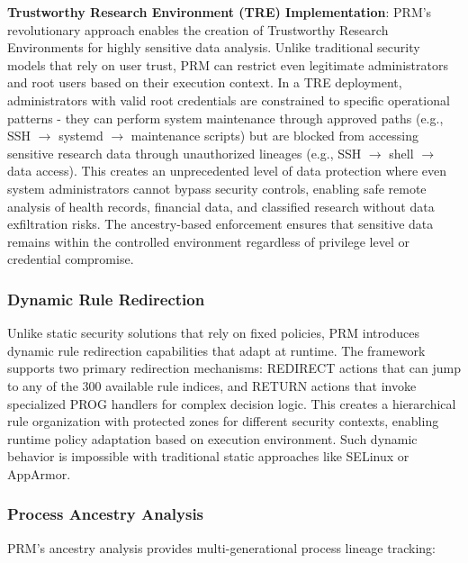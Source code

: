 \documentclass[conference]{IEEEtran}
\begin{document}
\textbf{Trustworthy Research Environment (TRE) Implementation}: PRM's revolutionary approach enables the creation of Trustworthy Research Environments for highly sensitive data analysis. Unlike traditional security models that rely on user trust, PRM can restrict even legitimate administrators and root users based on their execution context. In a TRE deployment, administrators with valid root credentials are constrained to specific operational patterns - they can perform system maintenance through approved paths (e.g., SSH $\rightarrow$ systemd $\rightarrow$ maintenance scripts) but are blocked from accessing sensitive research data through unauthorized lineages (e.g., SSH $\rightarrow$ shell $\rightarrow$ data access). This creates an unprecedented level of data protection where even system administrators cannot bypass security controls, enabling safe remote analysis of health records, financial data, and classified research without data exfiltration risks. The ancestry-based enforcement ensures that sensitive data remains within the controlled environment regardless of privilege level or credential compromise.

\subsubsection{Dynamic Rule Redirection}
Unlike static security solutions that rely on fixed policies, PRM introduces dynamic rule redirection capabilities that adapt at runtime. The framework supports two primary redirection mechanisms: REDIRECT actions that can jump to any of the 300 available rule indices, and RETURN actions that invoke specialized PROG handlers for complex decision logic. This creates a hierarchical rule organization with protected zones for different security contexts, enabling runtime policy adaptation based on execution environment. Such dynamic behavior is impossible with traditional static approaches like SELinux or AppArmor.

\subsubsection{Process Ancestry Analysis}
PRM's ancestry analysis provides multi-generational process lineage tracking:
\end{document}
